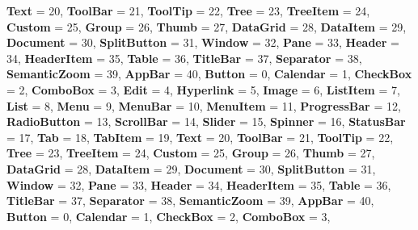 \begin{DoxyCompactItemize}
{\bfseries Text} = 20, 
{\bfseries Tool\+Bar} = 21, 
\newline
{\bfseries Tool\+Tip} = 22, 
{\bfseries Tree} = 23, 
{\bfseries Tree\+Item} = 24, 
{\bfseries Custom} = 25, 
\newline
{\bfseries Group} = 26, 
{\bfseries Thumb} = 27, 
{\bfseries Data\+Grid} = 28, 
{\bfseries Data\+Item} = 29, 
\newline
{\bfseries Document} = 30, 
{\bfseries Split\+Button} = 31, 
{\bfseries Window} = 32, 
{\bfseries Pane} = 33, 
\newline
{\bfseries Header} = 34, 
{\bfseries Header\+Item} = 35, 
{\bfseries Table} = 36, 
{\bfseries Title\+Bar} = 37, 
\newline
{\bfseries Separator} = 38, 
{\bfseries Semantic\+Zoom} = 39, 
{\bfseries App\+Bar} = 40, 
{\bfseries Button} = 0, 
\newline
{\bfseries Calendar} = 1, 
{\bfseries Check\+Box} = 2, 
{\bfseries Combo\+Box} = 3, 
{\bfseries Edit} = 4, 
\newline
{\bfseries Hyperlink} = 5, 
{\bfseries Image} = 6, 
{\bfseries List\+Item} = 7, 
{\bfseries List} = 8, 
\newline
{\bfseries Menu} = 9, 
{\bfseries Menu\+Bar} = 10, 
{\bfseries Menu\+Item} = 11, 
{\bfseries Progress\+Bar} = 12, 
\newline
{\bfseries Radio\+Button} = 13, 
{\bfseries Scroll\+Bar} = 14, 
{\bfseries Slider} = 15, 
{\bfseries Spinner} = 16, 
\newline
{\bfseries Status\+Bar} = 17, 
{\bfseries Tab} = 18, 
{\bfseries Tab\+Item} = 19, 
{\bfseries Text} = 20, 
\newline
{\bfseries Tool\+Bar} = 21, 
{\bfseries Tool\+Tip} = 22, 
{\bfseries Tree} = 23, 
{\bfseries Tree\+Item} = 24, 
\newline
{\bfseries Custom} = 25, 
{\bfseries Group} = 26, 
{\bfseries Thumb} = 27, 
{\bfseries Data\+Grid} = 28, 
\newline
{\bfseries Data\+Item} = 29, 
{\bfseries Document} = 30, 
{\bfseries Split\+Button} = 31, 
{\bfseries Window} = 32, 
\newline
{\bfseries Pane} = 33, 
{\bfseries Header} = 34, 
{\bfseries Header\+Item} = 35, 
{\bfseries Table} = 36, 
\newline
{\bfseries Title\+Bar} = 37, 
{\bfseries Separator} = 38, 
{\bfseries Semantic\+Zoom} = 39, 
{\bfseries App\+Bar} = 40, 
\newline
{\bfseries Button} = 0, 
{\bfseries Calendar} = 1, 
{\bfseries Check\+Box} = 2, 
{\bfseries Combo\+Box} = 3, 

\end{DoxyCompactItemize}
